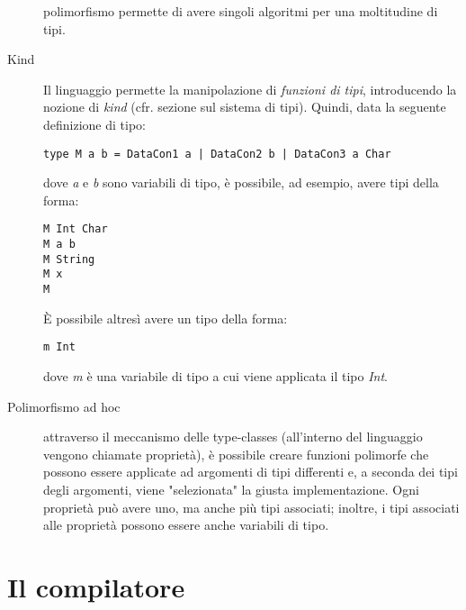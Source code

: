 \documentclass[10pt,a4paper]{article}
\begin{document}
\begin{description}
polimorfismo permette di avere singoli algoritmi per una moltitudine di tipi.
\item[Kind] Il linguaggio permette la manipolazione di \textit{funzioni di tipi}, introducendo la nozione di
\textit{kind} (cfr. sezione sul sistema di tipi). Quindi, data la seguente definizione di tipo:
\begin{lstlisting}
type M a b = DataCon1 a | DataCon2 b | DataCon3 a Char
\end{lstlisting}
dove \textit{a} e \textit{b} sono variabili di tipo, è possibile, ad esempio, avere tipi della forma:
\begin{lstlisting}
M Int Char
M a b
M String
M x
M
\end{lstlisting}
\`E possibile altresì avere un tipo della forma:
\begin{lstlisting}
m Int
\end{lstlisting}
dove \textit{m} è una variabile di tipo a cui viene applicata il tipo \textit{Int}.
\item[Polimorfismo ad hoc] attraverso il meccanismo delle type-classes (all'interno del linguaggio vengono chiamate
proprietà), è possibile creare funzioni polimorfe che possono essere applicate ad argomenti di tipi differenti e, a
seconda dei tipi degli argomenti, viene "selezionata" la giusta implementazione. Ogni proprietà può avere uno, ma anche
più tipi associati; inoltre, i tipi associati alle proprietà possono essere anche variabili di tipo.

\end{description}

\section{Il compilatore}
\end{document}
